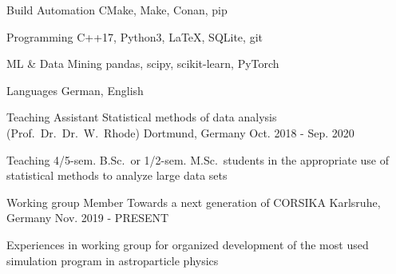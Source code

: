 \documentclass[11pt, a4paper]{Awesome-CV/awesome-cv}
\begin{document}
\begin{cvskills}
    \cvskill
    {Build Automation} %
    {CMake, Make, Conan, pip} %


    \cvskill
    {Programming} %
    {C++17, Python3, LaTeX, SQLite, git} %

    \cvskill
    {ML \& Data Mining} %
    {pandas, scipy, scikit-learn, PyTorch} %

    \cvskill
    {Languages} %
    {German, English} %
\end{cvskills}

\begin{cventries}
    \cventry
    {Teaching Assistant} %
    {Statistical methods of data analysis (Prof.~Dr.~Dr.~W.~Rhode)} %
    {Dortmund, Germany} %
    {Oct. 2018 - Sep. 2020} %
    {
        \begin{cvitems} %
        \item {Teaching 4/5-sem. B.Sc.\ or 1/2-sem. M.Sc.~students in the appropriate use of statistical methods to analyze large data sets}
        \end{cvitems}
    }

    \cventry
    {Working group Member} %
    {Towards a next generation of CORSIKA} %
    {Karlsruhe, Germany} %
    {Nov. 2019 - PRESENT} %
    {
        \begin{cvitems} %
        \item {Experiences in working group for organized development of the most used simulation program in astroparticle physics}
        \end{cvitems}
    }
\end{cventries}
\end{document}
